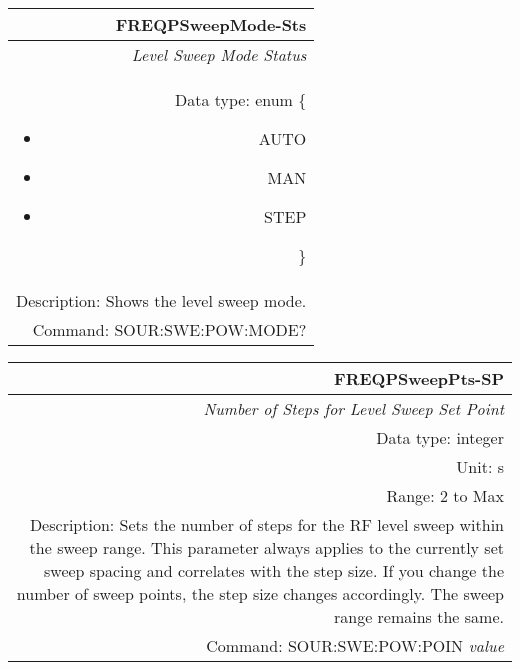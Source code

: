 \documentclass[openany]{article}
\begin{document}
		\begin{tabular}{N}
			\hline
			\bfseries FREQPSweepMode-Sts \\ \hline
			\emph{Level Sweep Mode Status} \\
			Data type: enum \{\begin{itemize}[noitemsep]
				\small
				\item[] AUTO
				\item[] MAN
				\item[] STEP
			\end{itemize}\} \\ 
			Description: Shows the level sweep mode. \\
			Command: SOUR:SWE:POW:MODE? \\

		\end{tabular}
%
		\begin{tabular}{N}
			\hline
			\bfseries FREQPSweepPts-SP \\ \hline
			\emph{Number of Steps for Level Sweep Set Point} \\
			Data type: integer \\
			Unit: s \\
			Range: 2 to Max \\ 
			Description: Sets the number of steps for the RF level sweep within the sweep range. This parameter always applies to the currently set sweep spacing and correlates with the step size. If you change the number of sweep points, the step size changes accordingly. The sweep range remains the same. \\
			Command: SOUR:SWE:POW:POIN \emph{value} \\
			
		\end{tabular}
\end{document}
